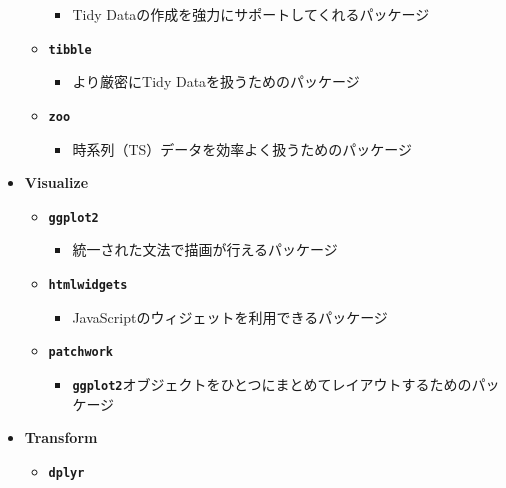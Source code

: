 \documentclass[
  12pt,
]{book}
\providecommand{\tightlist}{%
  \setlength{\itemsep}{0pt}\setlength{\parskip}{0pt}}
\begin{document}
\begin{itemize}
\begin{itemize}
    \begin{itemize}
    \tightlist
    \item
      Tidy Dataの作成を強力にサポートしてくれるパッケージ
    \end{itemize}
  \item
    \textbf{\texttt{tibble}} \citep{R-tibble}

    \begin{itemize}
    \tightlist
    \item
      より厳密にTidy Dataを扱うためのパッケージ
    \end{itemize}
  \item
    \textbf{\texttt{zoo}} \citep{R-zoo}

    \begin{itemize}
    \tightlist
    \item
      時系列（TS）データを効率よく扱うためのパッケージ
    \end{itemize}
  \end{itemize}
\item
  \textbf{Visualize}

  \begin{itemize}
  \tightlist
  \item
    \textbf{\texttt{ggplot2}} \citep{R-ggplot2}

    \begin{itemize}
    \tightlist
    \item
      統一された文法で描画が行えるパッケージ
    \end{itemize}
  \item
    \textbf{\texttt{htmlwidgets}} \citep{R-htmlwidgets}

    \begin{itemize}
    \tightlist
    \item
      JavaScriptのウィジェットを利用できるパッケージ
    \end{itemize}
  \item
    \textbf{\texttt{patchwork}} \citep{R-patchwork}

    \begin{itemize}
    \tightlist
    \item
      \textbf{\texttt{ggplot2}}オブジェクトをひとつにまとめてレイアウトするためのパッケージ
    \end{itemize}
  \end{itemize}
\item
  \textbf{Transform}

  \begin{itemize}
  \tightlist
  \item
    \textbf{\texttt{dplyr}} \citep{R-dplyr}


\end{itemize}
\end{itemize}
\end{document}
